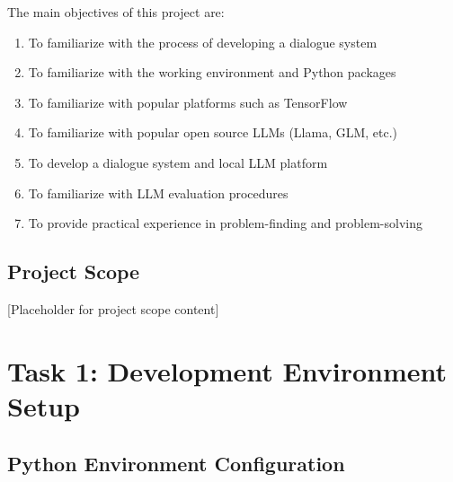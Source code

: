 \documentclass[12pt,a4paper]{article}
\begin{document}
The main objectives of this project are:
\begin{enumerate}
    \item To familiarize with the process of developing a dialogue system
    \item To familiarize with the working environment and Python packages
    \item To familiarize with popular platforms such as TensorFlow
    \item To familiarize with popular open source LLMs (Llama, GLM, etc.)
    \item To develop a dialogue system and local LLM platform
    \item To familiarize with LLM evaluation procedures
    \item To provide practical experience in problem-finding and problem-solving
\end{enumerate}

\subsection{Project Scope}


[Placeholder for project scope content]

\section{Task 1: Development Environment Setup}


\subsection{Python Environment Configuration}

\end{document}
